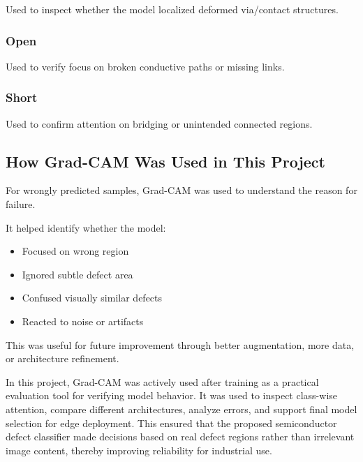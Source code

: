 Used to inspect whether the model localized deformed via/contact structures.

\subsubsection{Open}

Used to verify focus on broken conductive paths or missing links.

\subsubsection{Short}

Used to confirm attention on bridging or unintended connected regions.

\subsection{How Grad-CAM Was Used in This Project}
For wrongly predicted samples, Grad-CAM was used to understand the reason for failure.

It helped identify whether the model:
\begin{itemize}
\item Focused on wrong region
\item Ignored subtle defect area
\item Confused visually similar defects
\item Reacted to noise or artifacts
\end{itemize}
This was useful for future improvement through better augmentation, more data, or architecture refinement.

In this project, Grad-CAM was actively used after training as a practical evaluation tool for verifying model behavior. It was used to inspect class-wise attention, compare different architectures, analyze errors, and support final model selection for edge deployment. This ensured that the proposed semiconductor defect classifier made decisions based on real defect regions rather than irrelevant image content, thereby improving reliability for industrial use.